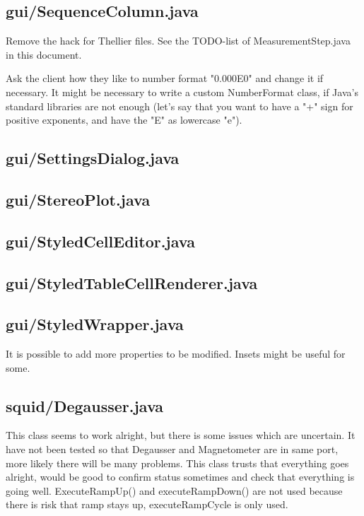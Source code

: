 \subsection{gui/SequenceColumn.java}

Remove the hack for Thellier files. See the TODO-list of MeasurementStep.java in this document.

Ask the client how they like to number format "0.000E0" and change it if necessary. It might be necessary to write a custom NumberFormat class, if Java's standard libraries are not enough (let's say that you want to have a "+" sign for positive exponents, and have the "E" as lowercase "e").


\subsection{gui/SettingsDialog.java}

\subsection{gui/StereoPlot.java}

\subsection{gui/StyledCellEditor.java}

\subsection{gui/StyledTableCellRenderer.java}

\subsection{gui/StyledWrapper.java}

It is possible to add more properties to be modified. Insets might be useful for some.


\subsection{squid/Degausser.java}

This class seems to work alright, but there is some issues which are uncertain. It have not been tested so that Degausser and Magnetometer are in same port, more likely there will be many problems. This class trusts that everything goes alright, would be good to confirm status sometimes and check that everything is going well. ExecuteRampUp() and executeRampDown() are not used because there is risk that ramp stays up, executeRampCycle is only used.


